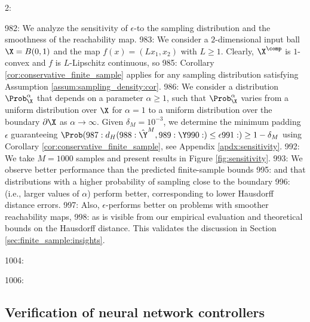 2: \documentclass[12pt]{l4dc2022} %
\begin{document}
982: 	We analyze the sensitivity of $\epsilon$-\randup  to the sampling distribution and the smoothness of the reachability map. 
983: 	We consider a $2$-dimensional input ball $\X=B(0,1)$ and the map $f(x)=(Lx_1,x_2)$ with $L\geq 1$. Clearly, $\X^\comp$ is $1$-convex and $f$ is $L$-Lipschitz continuous, so %
985: 	Corollary \ref{cor:conservative_finite_sample} applies for any sampling distribution satisfying Assumption \ref{assum:sampling_density:cor}. 
986: We consider a distribution $\Prob_\X^\alpha$ that depends on a parameter $\alpha\geq 1$, such that $\Prob_\X^\alpha$ varies from a uniform distribution over $\X$ for $\alpha=1$ to a uniform distribution over the boundary $\partial\X$ as $\alpha\rightarrow\infty$. Given $\delta_M=10^{-3}$, we determine the minimum padding $\epsilon$ guaranteeing $\Prob(
987: d_H(
988: \hat\Y^M, 
989: \Y
990: )\leq \epsilon
991: )\geq 1-\delta_M$ using Corollary \ref{cor:conservative_finite_sample}, see Appendix \ref{apdx:sensitivity}. 
992: We take $M=1000$ samples and present results in Figure \ref{fig:sensitivity}. 
993: We observe better performance than the predicted finite-sample bounds 
995: and that distributions with a higher probability of sampling close to the boundary %
996: (i.e., larger values of $\alpha$) perform better, corresponding to lower Hausdorff distance errors. 
997: Also, $\epsilon$-\randup performs better on problems with smoother reachability maps, %
998: as is visible from our empirical evaluation and theoretical bounds on the Hausdorff distance.  This validates the discussion in Section \ref{sec:finite_sample:insights}.

1004: \vspace{-2mm}

1006: \subsection{Verification of neural network controllers}\label{sec:results:verif_closed_nn}
\end{document}
